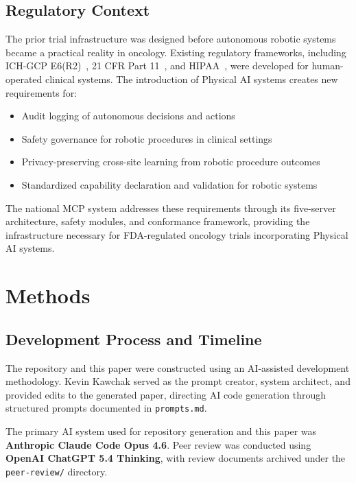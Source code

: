 \documentclass{article}
\begin{document}
\subsection{Regulatory Context}

The prior trial infrastructure was designed before autonomous robotic systems became a practical reality in oncology. Existing regulatory frameworks, including ICH-GCP E6(R2)~\cite{ichgcp2016}, 21 CFR Part 11~\cite{fda2003part11}, and HIPAA~\cite{hipaa1996}, were developed for human-operated clinical systems. The introduction of Physical AI systems creates new requirements for:

\begin{itemize}[leftmargin=*]
\item Audit logging of autonomous decisions and actions
\item Safety governance for robotic procedures in clinical settings
\item Privacy-preserving cross-site learning from robotic procedure outcomes
\item Standardized capability declaration and validation for robotic systems
\end{itemize}

The national MCP system addresses these requirements through its five-server architecture, safety modules, and conformance framework, providing the infrastructure necessary for FDA-regulated oncology trials incorporating Physical AI systems.

\section{Methods}
\label{sec:methods}

\subsection{Development Process and Timeline}

The repository and this paper were constructed using an AI-assisted development methodology. Kevin Kawchak served as the prompt creator, system architect, and provided edits to the generated paper, directing AI code generation through structured prompts documented in \texttt{prompts.md}.

The primary AI system used for repository generation and this paper was \textbf{Anthropic Claude Code Opus 4.6}. Peer review was conducted using \textbf{OpenAI ChatGPT 5.4 Thinking}, with review documents archived under the \texttt{peer-review/} directory.
\end{document}
